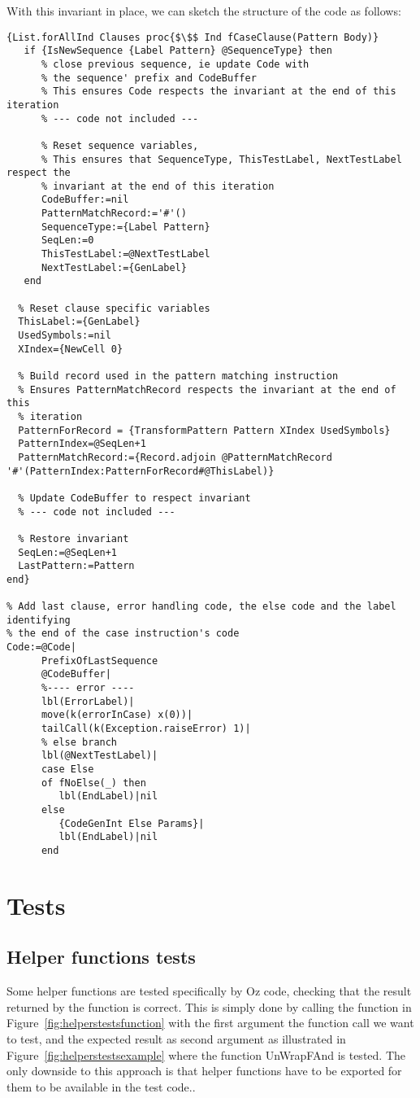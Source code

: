 \documentclass[a4paper]{memoir}
\begin{document}
With this invariant in place, we can sketch the structure of the code as
follows:
\begin{lstlisting}[mathescape]
{List.forAllInd Clauses proc{$\$$ Ind fCaseClause(Pattern Body)}
   if {IsNewSequence {Label Pattern} @SequenceType} then
      % close previous sequence, ie update Code with
      % the sequence' prefix and CodeBuffer
      % This ensures Code respects the invariant at the end of this iteration
      % --- code not included ---

      % Reset sequence variables, 
      % This ensures that SequenceType, ThisTestLabel, NextTestLabel respect the 
      % invariant at the end of this iteration
      CodeBuffer:=nil
      PatternMatchRecord:='#'()
      SequenceType:={Label Pattern}
      SeqLen:=0
      ThisTestLabel:=@NextTestLabel
      NextTestLabel:={GenLabel}
   end

  % Reset clause specific variables 
  ThisLabel:={GenLabel}
  UsedSymbols:=nil
  XIndex={NewCell 0}

  % Build record used in the pattern matching instruction
  % Ensures PatternMatchRecord respects the invariant at the end of this
  % iteration
  PatternForRecord = {TransformPattern Pattern XIndex UsedSymbols}
  PatternIndex=@SeqLen+1
  PatternMatchRecord:={Record.adjoin @PatternMatchRecord '#'(PatternIndex:PatternForRecord#@ThisLabel)}

  % Update CodeBuffer to respect invariant
  % --- code not included ---

  % Restore invariant
  SeqLen:=@SeqLen+1
  LastPattern:=Pattern
end}

% Add last clause, error handling code, the else code and the label identifying
% the end of the case instruction's code
Code:=@Code|
      PrefixOfLastSequence
      @CodeBuffer|
      %---- error ----
      lbl(ErrorLabel)|
      move(k(errorInCase) x(0))|
      tailCall(k(Exception.raiseError) 1)|
      % else branch
      lbl(@NextTestLabel)|
      case Else
      of fNoElse(_) then
         lbl(EndLabel)|nil
      else
         {CodeGenInt Else Params}|
         lbl(EndLabel)|nil
      end
\end{lstlisting}


\section{Tests}
\subsection{Helper functions tests}
Some helper functions are tested specifically by Oz code, checking that the result returned by the function is correct. This is simply done by calling the function in Figure~\ref{fig:helperstestsfunction} with the first argument the function call we want to test, and the expected result as second argument as illustrated in Figure~\ref{fig:helperstestsexample} where the function UnWrapFAnd is tested.
The only downside to this approach is that helper functions have to be exported for them to be available in the test code..
\end{document}
